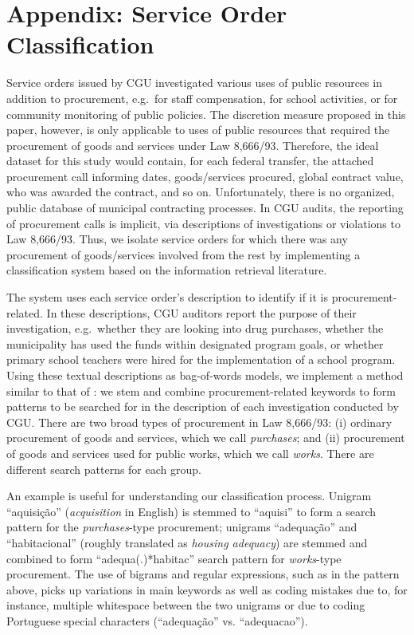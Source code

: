 \documentclass[11pt]{article}
\begin{document}
\clearpage

\appendix

\section{Appendix: Service Order Classification} \label{sec:appendixA}

Service orders issued by CGU investigated various uses of public resources in addition to procurement, e.g.~for staff compensation, for school activities, or for community monitoring of public policies. The discretion measure proposed in this paper, however, is only applicable to uses of public resources that required the procurement of goods and services under Law 8,666/93. Therefore, the ideal dataset for this study would contain, for each federal transfer, the attached procurement call informing dates, goods/services procured, global contract value, who was awarded the contract, and so on. Unfortunately, there is no organized, public database of municipal contracting processes. In CGU audits, the reporting of procurement calls is implicit, via descriptions of investigations or violations to Law 8,666/93. Thus, we isolate service orders for which there was any procurement of goods/services involved from the rest by implementing a classification system based on the information retrieval literature.

The system uses each service order's description to identify if it is procurement-related. In these descriptions, CGU auditors report the purpose of their investigation, e.g.~whether they are looking into drug purchases, whether the municipality has used the funds within designated program goals, or whether primary school teachers were hired for the implementation of a school program. Using these textual descriptions as bag-of-words models, we implement a method similar to that of \citet{HopkinsMethodAutomatedNonparametric2009}: we stem and combine procurement-related keywords to form patterns to be searched for in the description of each investigation conducted by CGU. There are two broad types of procurement in Law 8,666/93: (i) ordinary procurement of goods and services, which we call \emph{purchases}; and (ii) procurement of goods and services used for public works, which we call \emph{works}. There are different search patterns for each group.

An example is useful for understanding our classification process. Unigram ``aquisição'' (\emph{acquisition} in English) is stemmed to ``aquisi'' to form a search pattern for the \emph{purchases}-type procurement; unigrams ``adequação'' and ``habitacional'' (roughly translated as \emph{housing adequacy}) are stemmed and combined to form ``adequa(.)*habitac'' search pattern for \emph{works}-type procurement. The use of bigrams and regular expressions, such as in the pattern above, picks up variations in main keywords as well as coding mistakes due to, for instance, multiple whitespace between the two unigrams or due to coding Portuguese special characters (``adequação'' vs. ``adequacao'').
\end{document}
